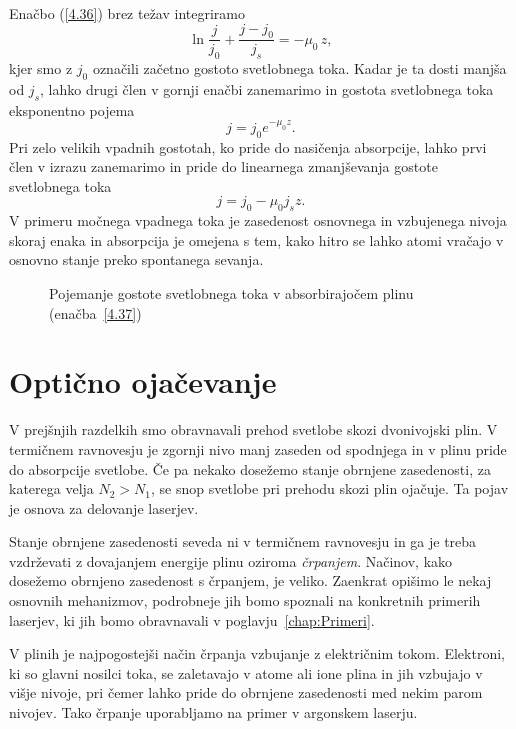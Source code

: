 Enačbo (\ref{4.36}) brez težav integriramo 
\begin{equation}
\ln\frac{j}{j_{0}}+\frac{j-j_{0}}{j_{s}}=-\mu_{0}\, z,
\label{4.37}
\end{equation}
kjer smo z $j_{0}$ označili začetno gostoto svetlobnega toka. Kadar je ta dosti
manjša od $j_{s}$, lahko drugi člen v gornji enačbi zanemarimo in gostota svetlobnega
toka eksponentno pojema
\begin{equation}
j = j_0 e^{-\mu_0 z}.
\end{equation}
Pri zelo velikih vpadnih gostotah, ko pride do nasičenja absorpcije, lahko prvi člen v izrazu 
zanemarimo in pride do linearnega zmanjševanja gostote svetlobnega toka
\begin{equation}
j=j_{0}-\mu_{0}j_{s}z.
\label{4.38}
\end{equation}
V primeru močnega vpadnega toka je zasedenost osnovnega in vzbujenega nivoja skoraj
enaka in absorpcija je omejena s tem, kako hitro se lahko atomi vračajo
v osnovno stanje preko spontanega sevanja. 

\begin{figure}[h]
\centering
\def\svgwidth{100truemm} 

\caption{Pojemanje gostote svetlobnega toka v absorbirajočem plinu (enačba~\ref{4.37})}
\label{fig:abs2}
\end{figure}

\section{Optično ojačevanje}
V prejšnjih razdelkih smo obravnavali prehod svetlobe skozi dvonivojski plin. V 
termičnem ravnovesju je zgornji nivo manj zaseden od spodnjega in v plinu pride
do absorpcije svetlobe. Če pa nekako dosežemo stanje obrnjene zasedenosti,
za katerega velja $N_{2}>N_{1}$, se snop svetlobe pri prehodu skozi plin ojačuje. Ta pojav
je osnova za delovanje laserjev. 

Stanje obrnjene zasedenosti seveda ni v termičnem ravnovesju in ga je treba vzdrževati z dovajanjem 
energije plinu oziroma {\it črpanjem}.
Načinov, kako dosežemo obrnjeno zasedenost s črpanjem, je veliko. Zaenkrat opišimo
le nekaj osnovnih mehanizmov, podrobneje jih bomo spoznali na konkretnih primerih 
laserjev, ki jih bomo obravnavali v poglavju~\ref{chap:Primeri}. 

V plinih je najpogostejši način črpanja vzbujanje z električnim tokom. Elektroni,
ki so glavni nosilci toka, se zaletavajo v atome ali ione plina in jih vzbujajo
v višje nivoje, pri čemer lahko pride do obrnjene zasedenosti med
nekim parom nivojev. Tako črpanje uporabljamo na primer v argonskem laserju. 

